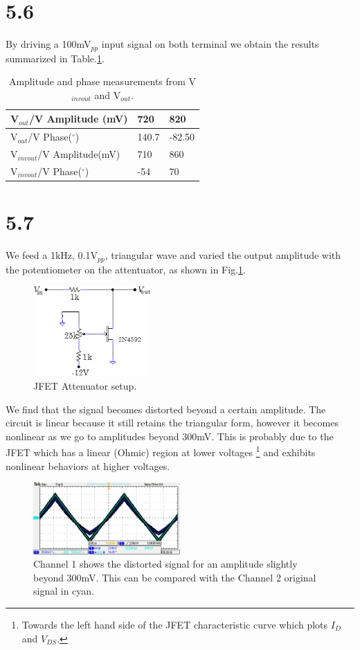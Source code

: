 \documentclass[authoryear, 12pt,5p, times]{elsarticle}
\begin{document}
  \section*{5.6}
By driving a 100mV$_{pp}$ input signal on both terminal we obtain the results summarized in Table.\ref{table2}.
\begin{table}
    \begin{tabular}{l|l|l}
    V$_{out}$/V Amplitude (mV)  & 720   & 820    \\ \hline
    V$_{out}$/V Phase($^{\circ}$)  & 140.7 & -82.50 \\ \hline
    V$_{invout}$/V Amplitude(mV)  & 710   & 860    \\ \hline
    V$_{invout}$/V Phase($^{\circ}$) & -54   & 70     \\
	\end{tabular}
    \caption{Amplitude and phase measurements from V$_{invout}$ and V$_{out}$.}
    \label{table2}
\end{table}
\section*{5.7}
We feed a 1kHz, 0.1V$_{pp}$, triangular wave and varied the output amplitude with the potentiometer on the attentuator, as shown in Fig.\ref{q7setup}.
 \begin{figure}[h!]
 \centering
 \includegraphics[width=0.4\textwidth]{figure/q7setup}
\caption{JFET Attenuator setup.}
\label{q7setup}
 \end{figure}
 We find that the signal becomes distorted beyond a certain amplitude. The circuit is linear because it still retains the triangular form, however it becomes nonlinear as we go to amplitudes beyond 300mV. This is probably due to the JFET which has a linear (Ohmic) region at lower voltages \footnote{Towards the left hand side of the JFET characteristic curve which plots $I_D$ and $V_{DS}$.} and exhibits nonlinear behaviors at higher voltages.
  \begin{figure}[h!]
 \centering
 \includegraphics[width=0.5\textwidth]{figure/q7trace}
\caption{Channel 1 shows the distorted signal for an amplitude slightly beyond 300mV. This can be compared with the Channel 2 original signal in cyan.}
\label{q7trace}
 \end{figure}
\end{document}
